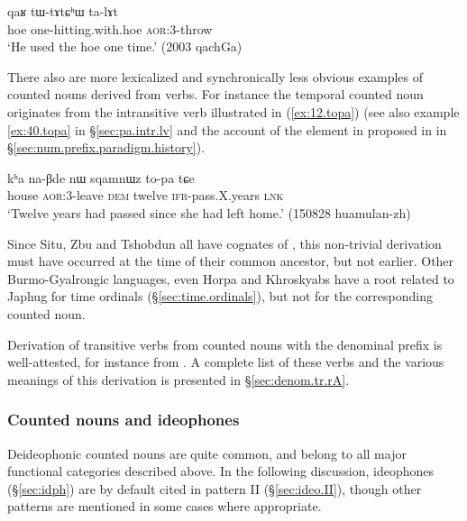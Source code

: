 \begin{exe}
\ex \label{ex:tWtAtChW}
\gll qaʁ tɯ-tɤtɕʰɯ ta-lɤt  \\
hoe one-hitting.with.hoe \textsc{aor}:3\flobv{}-throw \\
\glt `He used the hoe one time.' (2003 qachGa)
\end{exe}

There also are more lexicalized and synchronically less obvious examples of counted nouns derived from verbs. For instance the temporal counted noun  originates from the intransitive verb   illustrated in (\ref{ex:12.topa}) (see also example \ref{ex:40.topa}  in §\ref{sec:pa.intr.lv} and the account of the  element in  proposed in in §\ref{sec:num.prefix.paradigm.history}). 

\begin{exe}
\ex \label{ex:12.topa} 
\gll kʰa na-βde nɯ sqamnɯz to-pa tɕe \\ 
house \textsc{aor}:3\flobv{}-leave \textsc{dem} twelve  \textsc{ifr}-pass.X.years \textsc{lnk} \\
\glt `Twelve years had passed since she had left home.' (150828 huamulan-zh)
\end{exe}

Since Situ, Zbu and Tshobdun all have cognates of , this non-trivial derivation must have occurred at the time of their common ancestor, but not earlier. Other Burmo-Gyalrongic languages, even Horpa and Khroskyabs \citep{jacques17stau} have a root related to Japhug  for time ordinals (§\ref{sec:time.ordinals}), but not for the corresponding counted noun. 
  
Derivation of transitive verbs from counted nouns with the denominal prefix  is well-attested, for instance  from . A complete list of these verbs and the various meanings of this derivation is presented in  §\ref{sec:denom.tr.rA}.
 
\subsubsection{Counted nouns and ideophones}   \label{sec:CN.ideophones}
Deideophonic counted nouns are quite common, and belong to all major functional categories described above. In the following discussion, ideophones (§\ref{sec:idph}) are by default cited in pattern II (§\ref{sec:ideo.II}), though other patterns are mentioned in some cases where appropriate.


